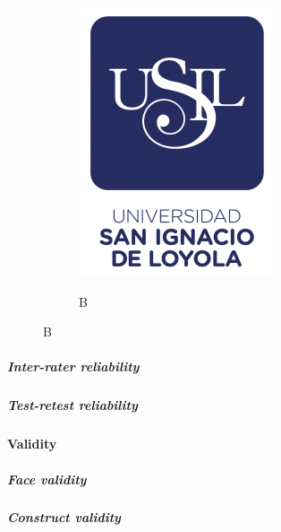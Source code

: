 \begin{figure}
  \hfill
  \begin{subfigure}{0.4\textwidth}
      \centering
      \caption{B}
      \includegraphics[width=\linewidth]{E_IMAGENES/0_Caratula/USIL LOGO.png}
      \label{fig:subfig2}
  \end{subfigure}
\end{figure}

\subparagraph{Inter-rater reliability}
\lipsum[10]

\subparagraph{Test-retest reliability}
\lipsum[11]

\paragraph{Validity}
\lipsum[12]

\subparagraph{Face validity}
\lipsum[13]

\subparagraph{Construct validity}
\lipsum[14]